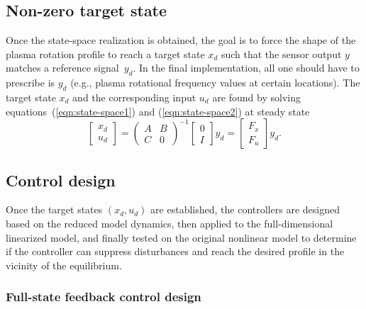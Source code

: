 \documentclass{iopart}
\begin{document}
\subsection{Non-zero target state}
Once the state-space realization is obtained, the goal is to force the shape of the plasma rotation profile to reach a target state $x_d$ such that the sensor output $y$ matches a reference signal~$y_d$. In the final implementation, all one should have to prescribe is $y_d$ (e.g., plasma rotational frequency values at certain locations). The target state $x_d$ and the corresponding input $u_d$ are found by solving equations~(\ref{eqn:state-space1}) and (\ref{eqn:state-space2}) at steady state
\begin{equation}
\left[\! \begin{array}{c}  x_{d} \\ u_{d}\end{array}\!\right]
  ={ \left(\! \begin{array}{cc} A  & B \\ C & 0 \end{array} \! \right)}^{-1} \left[\! \begin{array}{c} 0 \\ I    \end{array}  \!\right] y_{d} = \left[\! \begin{array}{c} F_x \\ F_u    \end{array}  \!\right] y_{d}.
\label{steadystate}
\end{equation}
%
 
\subsection{Control design} 
Once the target states $\left( x_{d} , u_{d} \right)$ are established, the controllers are designed based on the reduced model dynamics, then applied to the full-dimensional linearized model, and finally tested on the original nonlinear model to determine if the controller can suppress disturbances and reach the desired profile in the vicinity of the equilibrium.


\subsubsection{Full-state feedback control design} 
\end{document}
